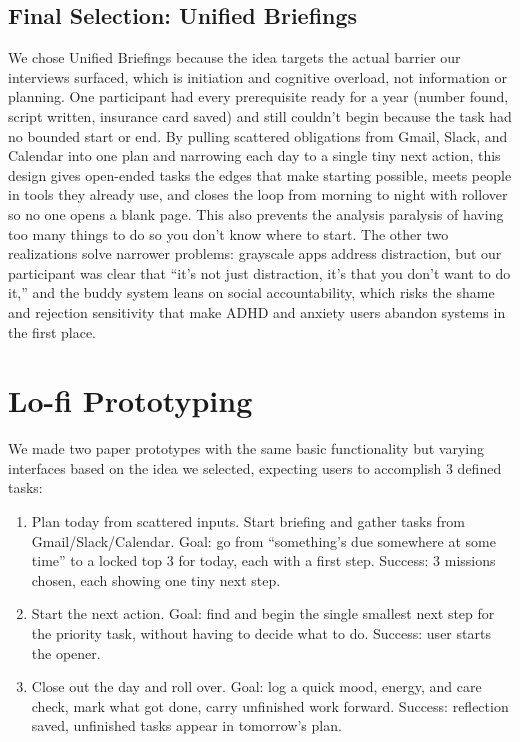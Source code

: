 \documentclass[sigplan,screen]{acmart}
\begin{document}
\subsection{Final Selection: Unified Briefings}
We chose Unified Briefings because the idea targets the actual barrier our interviews surfaced, which is initiation and cognitive overload, not information or planning. One participant had every prerequisite ready for a year (number found, script written, insurance card saved) and still couldn't begin because the task had no bounded start or end. By pulling scattered obligations from Gmail, Slack, and Calendar into one plan and narrowing each day to a single tiny next action, this design gives open-ended tasks the edges that make starting possible, meets people in tools they already use, and closes the loop from morning to night with rollover so no one opens a blank page. This also prevents the analysis paralysis of having too many things to do so you don't know where to start. The other two realizations solve narrower problems: grayscale apps address distraction, but our participant was clear that ``it's not just distraction, it's that you don't want to do it,'' and the buddy system leans on social accountability, which risks the shame and rejection sensitivity that make ADHD and anxiety users abandon systems in the first place.

\section{Lo-fi Prototyping}
We made two paper prototypes with the same basic functionality but varying interfaces based on the idea we selected, expecting users to accomplish 3 defined tasks:
\begin{enumerate}
  \item Plan today from scattered inputs. Start briefing and gather tasks from Gmail/Slack/Calendar. Goal: go from ``something's due somewhere at some time'' to a locked top 3 for today, each with a first step. Success: 3 missions chosen, each showing one tiny next step.
  \item Start the next action. Goal: find and begin the single smallest next step for the priority task, without having to decide what to do. Success: user starts the opener.
  \item Close out the day and roll over. Goal: log a quick mood, energy, and care check, mark what got done, carry unfinished work forward. Success: reflection saved, unfinished tasks appear in tomorrow's plan.
\end{enumerate}
\end{document}
